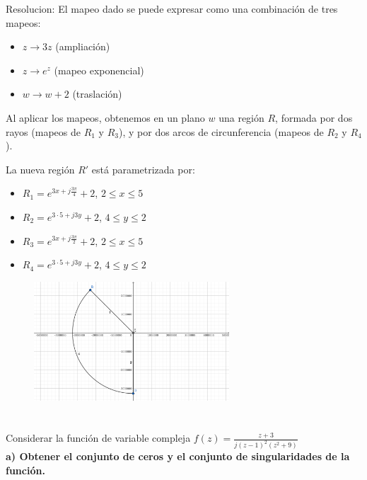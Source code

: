 \documentclass[12pt]{report}
\begin{document}
Resolucion:
El mapeo dado se puede expresar como una combinación de tres mapeos:

\begin{itemize}
    \item $z \rightarrow 3z$ (ampliación)
    \item $z \rightarrow e^z$ (mapeo exponencial)
    \item $w \rightarrow w + 2$ (traslación)
\end{itemize}

Al aplicar los mapeos, obtenemos en un plano $w$ una región $R$, formada por dos rayos (mapeos de $R_1$ y $R_3$), y por dos arcos de circunferencia (mapeos de $R_2$ y $R_4$).

La nueva región $R'$ está parametrizada por:
\begin{itemize}
    \item $R_1 = e^{3x+j\frac{3\pi}{4}} + 2$, $2 \leq x \leq 5$
    \item $R_2 = e^{3 \cdot 5+j3y} + 2$, $4 \leq y \leq 2$
    \item $R_3 = e^{3x+j\frac{3\pi}{2}} + 2$, $2 \leq x \leq 5$
    \item $R_4 = e^{3 \cdot 5+j3y} + 2$, $4 \leq y \leq 2$
\end{itemize}


\begin{figure}[h] %
    \centering %
    \includegraphics[width=0.65\textwidth]{./Imagenes/foto2Ej4.png} %
\end{figure}

\chapter{}%

Considerar la función de variable compleja $f(z) =\frac{z + 3}{j(z - 1)^2(z^2 + 9)}$\\[6pt]

\textbf{a) Obtener el conjunto de ceros y el conjunto de singularidades de la función.}\\[6pt]
\end{document}
